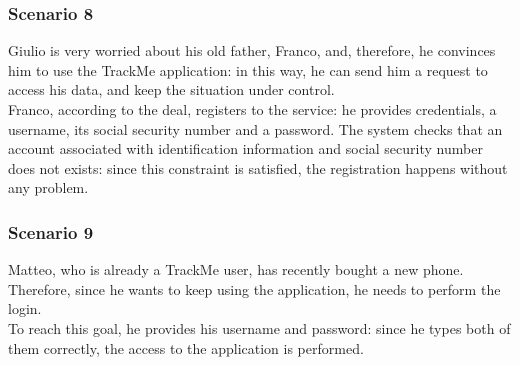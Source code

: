 \subsubsection{Scenario 8}
Giulio is very worried about his old father, Franco, and, therefore, he convinces him to use the TrackMe application: in this way, he can send him a request to access his data, and keep the situation under control. \\
Franco, according to the deal, registers to the service: he provides credentials, a username, its social security number and a password. 
The system checks that an account associated with identification information and social security number does not exists: since this constraint is satisfied, the registration happens without any problem.  

\subsubsection{Scenario 9}
Matteo, who is already a TrackMe user, has recently bought a new phone.
Therefore, since he wants to keep using the application, he needs to perform the login.\\
To reach this goal, he provides his username and password: since he types both of them correctly, the access to the application is performed. 
